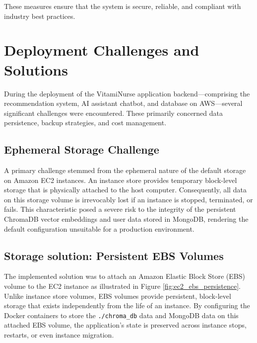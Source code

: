 These measures ensure that the system is secure, reliable, and
compliant with industry best practices.

\newpage
\section{Deployment Challenges and Solutions}
During the deployment of the VitamiNurse application backend—comprising the recommendation system, AI assistant chatbot, and database on AWS—several significant challenges were encountered. These primarily concerned data persistence, backup strategies, and cost management.

\subsection{Ephemeral Storage Challenge}
A primary challenge stemmed from the ephemeral nature of the default storage on Amazon EC2 instances. An instance store provides temporary block-level storage that is physically attached to the host computer. Consequently, all data on this storage volume is irrevocably lost if an instance is stopped, terminated, or fails. This characteristic posed a severe risk to the integrity of the persistent ChromaDB vector embeddings and user data stored in MongoDB, rendering the default configuration unsuitable for a production environment.

\subsection{Storage solution: Persistent EBS Volumes}
The implemented solution was to attach an Amazon Elastic Block Store (EBS) volume to the EC2 instance as illustrated in Figure \ref{fig:ec2_ebs_persistence}. Unlike instance store volumes, EBS volumes provide persistent, block-level storage that exists independently from the life of an instance. By configuring the Docker containers to store the \texttt{./chroma\_db} data and MongoDB data on this attached EBS volume, the application's state is preserved across instance stops, restarts, or even instance migration.

